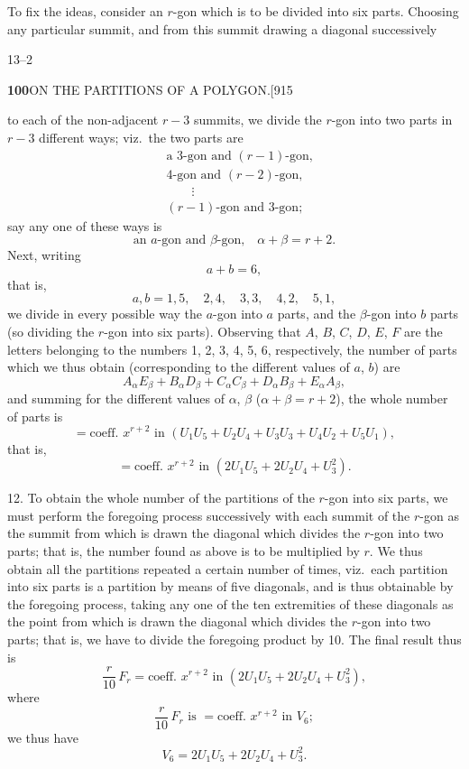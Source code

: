 \documentclass[11pt]{article}
\begin{document}
\hspace{1em} To fix the ideas, consider an $r$-gon which is to be divided into
six parts. Choosing any particular summit, and from this summit drawing a
diagonal successively

\hfill 13--2

\newpage
\noindent\textbf{100}\hfill ON THE PARTITIONS OF A POLYGON.\hfill[915

\smallskip
to each of the non-adjacent $r-3$ summits, we divide the $r$-gon into two
parts in $r-3$ different ways; viz.\ the two parts are
\[
\begin{aligned}
&\text{a 3-gon and } (r-1)\text{-gon,}\\
&\text{4-gon and } (r-2)\text{-gon,}\\
&\qquad\vdots\\
&(r-1)\text{-gon and 3-gon;}
\end{aligned}
\]
say any one of these ways is
\[
\text{an } a\text{-gon and } \beta\text{-gon,}\quad \alpha+\beta=r+2.
\]
Next, writing
\[
a+b=6,
\]
that is,
\[
a, b = 1, 5,\quad 2, 4,\quad 3, 3,\quad 4, 2,\quad 5, 1,
\]
we divide in every possible way the $a$-gon into $a$ parts, and the
$\beta$-gon into $b$ parts (so dividing the $r$-gon into six parts).
Observing that $A$, $B$, $C$, $D$, $E$, $F$ are the letters belonging to the
numbers 1, 2, 3, 4, 5, 6, respectively, the number of parts which we thus
obtain (corresponding to the different values of $a$, $b$) are
\[
A_{\alpha}E_{\beta}+B_{\alpha}D_{\beta}+C_{\alpha}C_{\beta}+D_{\alpha}B_{\beta}+E_{\alpha}A_{\beta},
\]
and summing for the different values of $\alpha$, $\beta$ ($\alpha+\beta=r+2$),
the whole number of parts is
\[
=\text{coeff. } x^{r+2} \text{ in } (U_{1}U_{5}+U_{2}U_{4}+U_{3}U_{3}+U_{4}U_{2}+U_{5}U_{1}),
\]
that is,
\[
=\text{coeff. } x^{r+2} \text{ in } (2U_{1}U_{5}+2U_{2}U_{4}+U_{3}^{2}).
\]

\hspace{1em} 12. To obtain the whole number of the partitions of the $r$-gon
into six parts, we must perform the foregoing process successively with each
summit of the $r$-gon as the summit from which is drawn the diagonal which
divides the $r$-gon into two parts; that is, the number found as above is to
be multiplied by $r$. We thus obtain all the partitions repeated a certain
number of times, viz.\ each partition into six parts is a partition by means
of five diagonals, and is thus obtainable by the foregoing process, taking
any one of the ten extremities of these diagonals as the point from which is
drawn the diagonal which divides the $r$-gon into two parts; that is, we
have to divide the foregoing product by 10. The final result thus is
\[
\frac{r}{10}\,F_{r}=\text{coeff. } x^{r+2} \text{ in } (2U_{1}U_{5}+2U_{2}U_{4}+U_{3}^{2}),
\]
where
\[
\frac{r}{10}\,F_{r} \text{ is } = \text{coeff. } x^{r+2} \text{ in } V_{6};
\]
we thus have
\[
V_{6}=2U_{1}U_{5}+2U_{2}U_{4}+U_{3}^{2}.
\]
\end{document}
